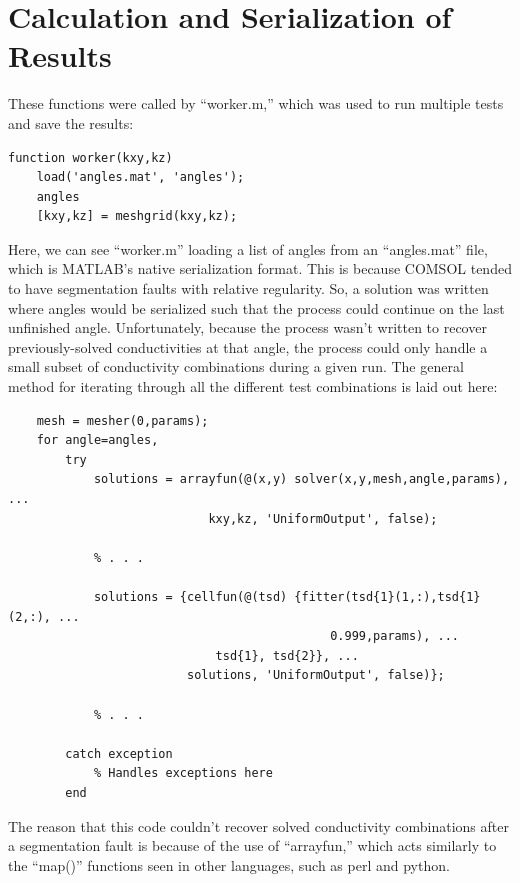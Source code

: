 \section{Calculation and Serialization of Results}

These functions were called by ``worker.m,'' which was used to run multiple
tests and save the results:

\small
\begin{verbatim}
function worker(kxy,kz)
    load('angles.mat', 'angles');
    angles
    [kxy,kz] = meshgrid(kxy,kz);
\end{verbatim}
\normalsize

Here, we can see ``worker.m'' loading a list of angles from an ``angles.mat''
file, which is MATLAB's native serialization format. This is because COMSOL
tended to have segmentation faults with relative regularity. So, a
solution was written where angles would be serialized such that the
process could continue on the last unfinished angle. Unfortunately, because the
process wasn't written to recover previously-solved conductivities at that
angle, the process could only handle a small subset of conductivity combinations
during a given run. The general method for iterating through all the different
test combinations is laid out here:

\small
\begin{verbatim}
    mesh = mesher(0,params);
    for angle=angles,
        try
            solutions = arrayfun(@(x,y) solver(x,y,mesh,angle,params), ...
                            kxy,kz, 'UniformOutput', false);

            % . . .

            solutions = {cellfun(@(tsd) {fitter(tsd{1}(1,:),tsd{1}(2,:), ...
                                             0.999,params), ...
                             tsd{1}, tsd{2}}, ...
                         solutions, 'UniformOutput', false)};

            % . . .

        catch exception
            % Handles exceptions here
        end

\end{verbatim}
\normalsize

The reason that this code couldn't recover solved conductivity combinations
after a segmentation fault is because of the use of ``arrayfun,'' which acts 
similarly to the ``map()'' functions seen in other languages, such as perl and
python.

